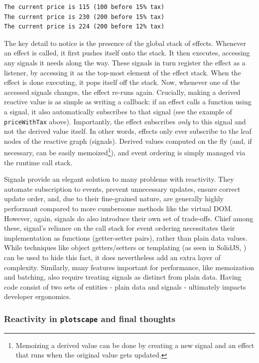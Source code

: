 \documentclass[
  openany]{book}
\theoremstyle{definition}
\theoremstyle{definition}
\theoremstyle{definition}
\theoremstyle{definition}
\theoremstyle{remark}
\begin{document}
\begin{verbatim}
The current price is 115 (100 before 15% tax)
The current price is 230 (200 before 15% tax)
The current price is 224 (200 before 12% tax)
\end{verbatim}

The key detail to notice is the presence of the global stack of effects. Whenever an effect is called, it first pushes itself onto the stack. It then executes, accessing any signals it needs along the way. These signals in turn register the effect as a listener, by accessing it as the top-most element of the effect stack. When the effect is done executing, it pops itself off the stack. Now, whenever one of the accessed signals changes, the effect re-runs again. Crucially, making a derived reactive value is as simple as writing a callback: if an effect calls a function using a signal, it also automatically subscribes to that signal (see the example of \texttt{priceWithTax} above). Importantly, the effect subscribes \emph{only} to this signal and not the derived value itself. In other words, effects only ever subscribe to the leaf nodes of the reactive graph (signals). Derived values computed on the fly (and, if necessary, can be easily memoized\footnote{Memoizing a derived value can be done by creating a new signal and an effect that runs when the original value gets updated.}), and event ordering is simply managed via the runtime call stack.

Signals provide an elegant solution to many problems with reactivity. They automate subscription to events, prevent unnecessary updates, ensure correct update order, and, due to their fine-grained nature, are generally highly performant compared to more cumbersome methods like the virtual DOM. However, again, signals do also introduce their own set of trade-offs. Chief among these, signal's reliance on the call stack for event ordering necessitates their implementation as functions (getter-setter pairs), rather than plain data values. While techniques like object getters/setters or templating (as seen in SolidJS, ) can be used to hide this fact, it does nevertheless add an extra layer of complexity. Similarly, many features important for performance, like memoization and batching, also require treating signals as distinct from plain data. Having code consist of two sets of entities - plain data and signals - ultimately impacts developer ergonomics.

\subsubsection{\texorpdfstring{Reactivity in \texttt{plotscape} and final thoughts}{Reactivity in plotscape and final thoughts}}\label{reactivity-solution}
\end{document}
